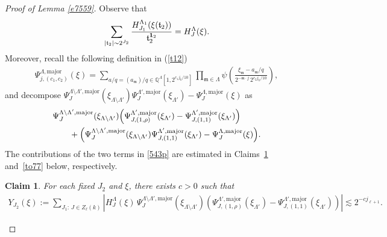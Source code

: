 \documentclass[11 pt,letterpaper]{amsart}
\theoremstyle{plain}
\newtheorem{claim}{Claim}\numberwithin{claim}{section}
\theoremstyle{definition}
\theoremstyle{remark} \theoremstyle{exam} \theoremstyle{ob}
\numberwithin{equation}{section}
\begin{document}
\begin{proof}[Proof of Lemma \ref{e7559}]
Observe that
\begin{align*}
\sum_{|\mathfrak{t}_2|\sim 2^{J_2}}
\frac{ H^{\Lambda_{1}}_{J_1}(\xi(\mathfrak{t}_2))}{\mathfrak{t}_2^{{\bf 1}_2}}
= H^{\Lambda}_{J}(\xi).
\end{align*}
Moreover, recall the following definition in (\ref{t12})
\begin{align*}
		\Psi_{j,(c_1,c_2)}^{\Lambda,\mathrm{major}}(\xi)
		= \sum_{a/q=(a_{\mathfrak{m}})/q \in \mathbb{Q}^{\Lambda}[1,2^{c_1 j_k/10}]}
		\prod_{\mathfrak{m}\in \Lambda} 
		\psi\!\left(
		\frac{\xi_{\mathfrak{m}} - a_{\mathfrak{m}}/q}
		{2^{-\mathfrak{m}\cdot j}\, 2^{c_2 j_k/10}}
		\right),
	\end{align*}
and decompose
$
\Psi_J^{\Lambda\setminus\Lambda',\mathrm{major}}(\xi_{\Lambda\setminus\Lambda'})
\Psi_{J}^{\Lambda',\mathrm{major}}(\xi_{\Lambda'})
-
\Psi_J^{\Lambda,\mathrm{major}}(\xi)
$
as
\begin{align}\label{543p}
&\Psi_J^{\Lambda\setminus\Lambda',\mathrm{major}}(\xi_{\Lambda\setminus\Lambda'})
\Bigl(
\Psi_{J,(1,\rho)}^{\Lambda',\mathrm{major}}(\xi_{\Lambda'})
-
\Psi_{J,(1,1)}^{\Lambda',\mathrm{major}}(\xi_{\Lambda'})
\Bigr)\\
&\qquad
+
\Bigl(
\Psi_J^{\Lambda\setminus\Lambda',\mathrm{major}}(\xi_{\Lambda\setminus\Lambda'})
\Psi_{J,(1,1)}^{\Lambda',\mathrm{major}}(\xi_{\Lambda'})
-
\Psi_J^{\Lambda,\mathrm{major}}(\xi)
\Bigr).\nonumber
\end{align}
The contributions of the two terms in \eqref{543p} are estimated in Claims~\ref{t7} and~\ref{to77} below, respectively.

\begin{claim}\label{t7}
For each fixed $J_2$ and $\xi$, there exists $c>0$ such that
\begin{align*}
Y_{J_2}(\xi)
:=
\sum_{J_1:\, J\in Z_\ell(k)}
\left|
H^{\Lambda}_{J}(\xi)\,
\Psi_J^{\Lambda\setminus\Lambda',\mathrm{major}}(\xi_{\Lambda\setminus\Lambda'})
\left(
\Psi_{J,(1,\rho)}^{\Lambda',\mathrm{major}}(\xi_{\Lambda'})
-
\Psi_{J,(1,1)}^{\Lambda',\mathrm{major}}(\xi_{\Lambda'})
\right)
\right|
\lesssim 2^{-c j_{\ell+1}}.
\end{align*}
\end{claim}
 



\end{proof}
\end{document}
